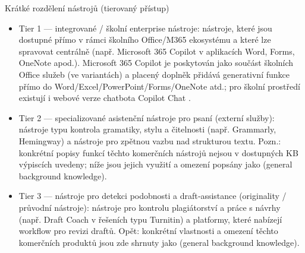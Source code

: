 \documentclass{report}%
\begin{document}
Krátké rozdělení nástrojů (tierovaný přístup)
\begin{itemize}
  \item Tier 1 — integrované / školní enterprise nástroje: nástroje, které jsou dostupné přímo v rámci školního Office/M365 ekosystému a které lze spravovat centrálně (např. Microsoft 365 Copilot v aplikacích Word, Forms, OneNote apod.). Microsoft 365 Copilot je poskytován jako součást školních Office služeb (ve variantách) a placený doplněk přidává generativní funkce přímo do Word/Excel/PowerPoint/Forms/OneNote atd.; pro školní prostředí existují i webové verze chatbota Copilot Chat \cite{kb_ai_101_tipu_pdf_04e4a115_page_3_1}. 
  \item Tier 2 — specializované asistenční nástroje pro psaní (externí služby): nástroje typu kontrola gramatiky, stylu a čitelnosti (např. Grammarly, Hemingway) a nástroje pro zpětnou vazbu nad strukturou textu. Pozn.: konkrétní popisy funkcí těchto komerčních nástrojů nejsou v dostupných KB výpiscích uvedeny; níže jsou jejich využití a omezení popsány jako (general background knowledge).
  \item Tier 3 — nástroje pro detekci podobnosti a draft‑assistance (originality / průvodní nástroje): nástroje pro kontrolu plagiátorství a práce s návrhy (např. Draft Coach v řešeních typu Turnitin) a platformy, které nabízejí workflow pro revizi draftů. Opět: konkrétní vlastnosti a omezení těchto komerčních produktů jsou zde shrnuty jako (general background knowledge).
\end{itemize}
\end{document}
